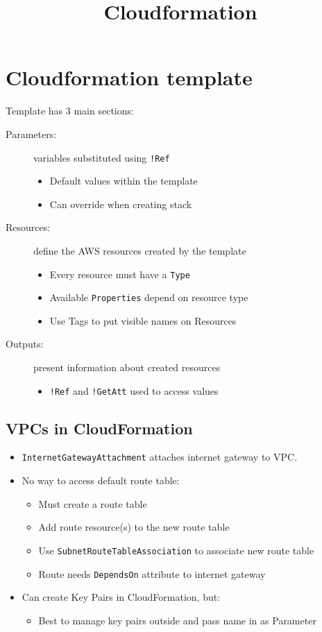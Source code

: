 \documentclass[slides]{pgnotes}
\title{Cloudformation}
\begin{document}
\maketitle

\section{Cloudformation template}

Template has 3 main sections:
\begin{description}

\item[Parameters:] variables substituted using \texttt{!Ref}
  \begin{itemize}
  \item Default values within the template
  \item Can override when creating stack
  \end{itemize}

\item[Resources:] define the AWS resources created by the template
  \begin{itemize}
  \item Every resource must have a \texttt{Type}
  \item Available \texttt{Properties} depend on resource type
  \item Use Tags to put visible names on Resources
  \end{itemize}

\item[Outputs:] present information about created resources
  \begin{itemize}
  \item \texttt{!Ref} and \texttt{!GetAtt} used to access values
  \end{itemize}

\end{description}


\subsection{VPCs in CloudFormation}

\begin{itemize}
\item \texttt{InternetGatewayAttachment} attaches internet gateway to VPC.
\item No way to access default route table:
  \begin{itemize}
  \item Must create a route table
  \item Add route resource(s) to the new route table
  \item Use \texttt{SubnetRouteTableAssociation} to associate new route table
  \item Route needs \texttt{DependsOn} attribute to internet gateway
  \end{itemize}
\item Can create Key Pairs in CloudFormation, but:
  \begin{itemize}
  \item Best to manage key pairs outside and pass name in as Parameter
  \end{itemize}
\end{itemize}
\end{document}

